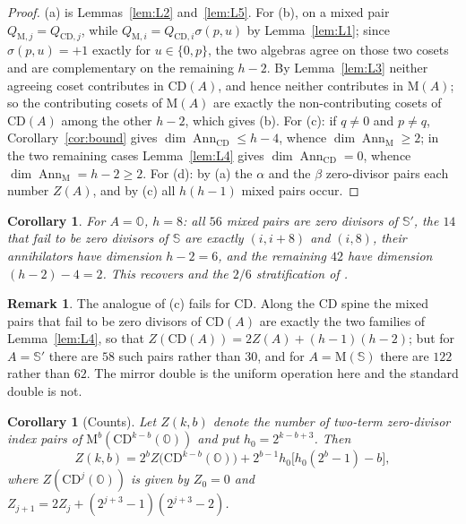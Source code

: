 \documentclass[11pt]{amsart}
\theoremstyle{plain}
\newtheorem{corollary}[theorem]{Corollary}
\theoremstyle{definition}
\newtheorem{remark}[theorem]{Remark}
\newcommand{\CD}{\mathrm{CD}}
\newcommand{\MM}{\mathrm{M}}
\newcommand{\Ann}{\operatorname{Ann}}
\newcommand{\OO}{\mathbb{O}}
\newcommand{\Sed}{\mathbb{S}}
\begin{document}
\begin{proof}
(a) is Lemmas~\ref{lem:L2} and~\ref{lem:L5}. For (b), on a mixed pair
$Q_{\MM,j}=Q_{\CD,j}$, while $Q_{\MM,i}=Q_{\CD,i}\sigma(p,u)$ by
Lemma~\ref{lem:L1}; since $\sigma(p,u)=+1$ exactly for $u\in\{0,p\}$, the two
algebras agree on those two cosets and are complementary on the remaining
$h-2$. By Lemma~\ref{lem:L3} neither agreeing coset contributes in $\CD(A)$, and
hence neither contributes in $\MM(A)$; so the contributing cosets of $\MM(A)$
are exactly the non-contributing cosets of $\CD(A)$ among the other $h-2$,
which gives (b). For (c): if $q\neq0$ and $p\neq q$, Corollary~\ref{cor:bound}
gives $\dim\Ann_{\CD}\leq h-4$, whence $\dim\Ann_{\MM}\geq2$; in the two
remaining cases Lemma~\ref{lem:L4} gives $\dim\Ann_{\CD}=0$, whence
$\dim\Ann_{\MM}=h-2\geq2$. For (d): by (a) the $\alpha$ and the $\beta$
zero-divisor pairs each number $Z(A)$, and by (c) all $h(h-1)$ mixed pairs
occur.
\end{proof}

\begin{corollary}\label{cor:props}
For $A=\OO$, $h=8$: all $56$ mixed pairs are zero divisors of $\Sed'$, the $14$
that fail to be zero divisors of $\Sed$ are exactly $(i,i+8)$ and $(i,8)$, their
annihilators have dimension $h-2=6$, and the remaining $42$ have dimension
$(h-2)-4=2$. This recovers \cite[Prop.~5.4]{LuiI} and the $2/6$ stratification of
\cite[Thm.~5.2]{LuiI}.
\end{corollary}

\begin{remark}\label{rem:asym}
The analogue of (c) fails for $\CD$. Along the $\CD$ spine the mixed pairs that
fail to be zero divisors of $\CD(A)$ are exactly the two families of
Lemma~\ref{lem:L4}, so that $Z(\CD(A))=2Z(A)+(h-1)(h-2)$; but for $A=\Sed'$
there are $58$ such pairs rather than $30$, and for $A=\MM(\Sed)$ there are
$122$ rather than $62$. The mirror double is the uniform operation here and the
standard double is not.
\end{remark}

\begin{corollary}[Counts]\label{cor:counts}
Let $Z(k,b)$ denote the number of two-term zero-divisor index pairs of
$\MM^{b}(\CD^{k-b}(\OO))$ and put $h_0=2^{k-b+3}$. Then
\[
  Z(k,b)=2^{b}Z\big(\CD^{k-b}(\OO)\big)
        +2^{b-1}h_0\big[h_0(2^{b}-1)-b\big],
\]
where $Z(\CD^{j}(\OO))$ is given by $Z_0=0$ and
$Z_{j+1}=2Z_j+(2^{j+3}-1)(2^{j+3}-2)$.
\end{corollary}
\end{document}
